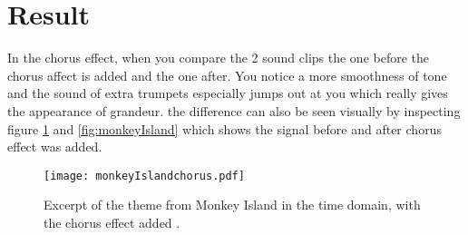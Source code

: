 
\section{Result}



In the chorus effect, when you compare the 2 sound clips the one before the chorus affect is added and the one after.
You notice a more smoothness of tone and the sound of extra trumpets especially jumps out at you which really gives the appearance of grandeur.
the difference can also be seen visually by inspecting figure \ref{fig:monkeyIslandchorus} and \ref{fig:monkeyIsland} which shows the signal before and after chorus effect was added.

\begin{figure}[!hbt]
	\centering
	\texttt{[image: monkeyIslandchorus.pdf]}
	\caption{Excerpt of the theme from Monkey Island in the time domain, with the chorus effect added .}
	\label{fig:monkeyIslandchorus}
\end{figure}
